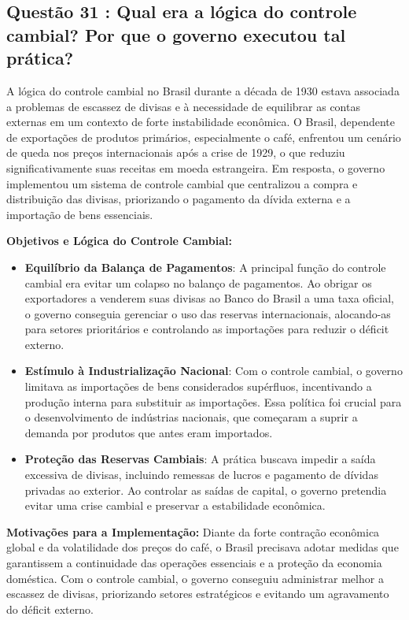 \documentclass[a4paper,12pt]{article}[abntex2]
\begin{document}
\subsection{\textbf{Questão 31 : Qual era a lógica do controle cambial? Por que o governo executou tal prática?}}

A lógica do controle cambial no Brasil durante a década de 1930 estava associada a problemas de escassez de divisas e à necessidade de equilibrar as contas externas em um contexto de forte instabilidade econômica. O Brasil, dependente de exportações de produtos primários, especialmente o café, enfrentou um cenário de queda nos preços internacionais após a crise de 1929, o que reduziu significativamente suas receitas em moeda estrangeira. Em resposta, o governo implementou um sistema de controle cambial que centralizou a compra e distribuição das divisas, priorizando o pagamento da dívida externa e a importação de bens essenciais.

\textbf{Objetivos e Lógica do Controle Cambial:}
\begin{itemize}
    \item \textbf{Equilíbrio da Balança de Pagamentos}: A principal função do controle cambial era evitar um colapso no balanço de pagamentos. Ao obrigar os exportadores a venderem suas divisas ao Banco do Brasil a uma taxa oficial, o governo conseguia gerenciar o uso das reservas internacionais, alocando-as para setores prioritários e controlando as importações para reduzir o déficit externo.
    \item \textbf{Estímulo à Industrialização Nacional}: Com o controle cambial, o governo limitava as importações de bens considerados supérfluos, incentivando a produção interna para substituir as importações. Essa política foi crucial para o desenvolvimento de indústrias nacionais, que começaram a suprir a demanda por produtos que antes eram importados.
    \item \textbf{Proteção das Reservas Cambiais}: A prática buscava impedir a saída excessiva de divisas, incluindo remessas de lucros e pagamento de dívidas privadas ao exterior. Ao controlar as saídas de capital, o governo pretendia evitar uma crise cambial e preservar a estabilidade econômica.
\end{itemize}

\textbf{Motivações para a Implementação:}
Diante da forte contração econômica global e da volatilidade dos preços do café, o Brasil precisava adotar medidas que garantissem a continuidade das operações essenciais e a proteção da economia doméstica. Com o controle cambial, o governo conseguiu administrar melhor a escassez de divisas, priorizando setores estratégicos e evitando um agravamento do déficit externo.
\end{document}
